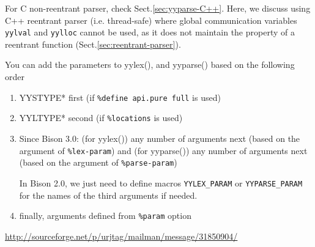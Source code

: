 For C non-reentrant parser, check Sect.\ref{sec:yyparse-C++}.
Here, we discuss using C++ reentrant parser (i.e. thread-safe) where global
communication variables \verb!yylval! and \verb!yylloc! cannot be used, as it
does not maintain the property of a reentrant function
(Sect.\ref{sec:reentrant-parser}).


You can add the parameters to yylex(), and yyparse() based on the following
order
\begin{enumerate}
  
  \item YYSTYPE* first (if \verb!%define api.pure full! is used)
  
  \item YYLTYPE* second (if \verb!%locations! is used)
  
  \item Since Bison 3.0: (for yylex()) any number of arguments next (based on the argument of
  \verb!%lex-param!) and (for yyparse()) any number of arguments next (based on
  the argument of \verb!%parse-param!)
  
  In Bison 2.0, we just need to define macros \verb!YYLEX_PARAM! or
  \verb!YYPARSE_PARAM! for the names of the third arguments if needed.
  
  \item finally, arguments defined from \verb!%param! option
\end{enumerate}
\url{http://sourceforge.net/p/urjtag/mailman/message/31850904/}

